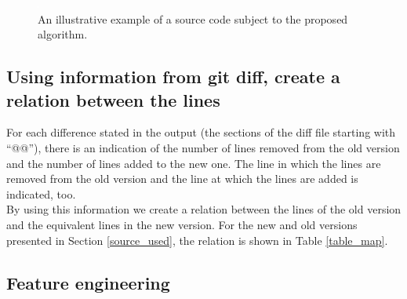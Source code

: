 \documentclass[
]{article}
\begin{document}
\begin{landscape}
\normalsize

\begin{figure}
\centering
\includegraphics{figures/fake.png}
\caption{An illustrative example of a source code subject to the proposed algorithm.}\label{old_and_new_figure}
\end{figure}

\end{landscape}

\newpage

\subsection{Using information from git diff, create a relation between the lines}\label{map}

For each difference stated in the output (the sections of the diff file
starting with ``@@''), there is an indication of the number of lines
removed from the old version and the number of lines added to the new
one. The line in which the lines are removed from the old version and
the line at which the lines are added is indicated, too.\\
By using this information we create a relation between the lines of the
old version and the equivalent lines in the new version. For the new and
old versions presented in Section \ref{source_used}, the relation is shown in
Table \ref{table_map}.

\small

\begin{table}

\caption{\label{tab:showing map}Relation between lines of the old version and lines of the new version\label{table_map}}
\centering
{}
\end{table}

\normalsize

\subsection{Feature engineering} \label{feature_creation}
\end{document}
